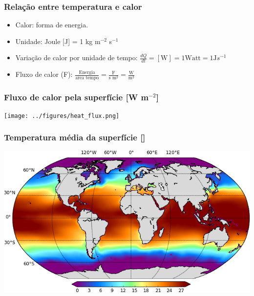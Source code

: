 \begin{frame}
\frametitle{Relação entre temperatura e calor}
    \small{
    \begin{itemize}[<+-| alert@+>]
    \item Calor: forma de energia.
    \item Unidade: Joule [J] = 1 kg m$^{-2}$ s$^{-1}$
    \item Variação de calor por unidade de tempo:
        $\frac{dQ}{dt} = [\text{W}] = 1 \text{Watt} = 1 \text{J} s^{-1}$
    \item Fluxo de calor (F):
        $\frac{\text{Energia}}{\text{area tempo}} = \frac{\text{F}}{\text{s m}^{2}} = \frac{\text{W}}{\text{m}^2}$
    \end{itemize}
    }
\end{frame}

\begin{frame}
\frametitle{Fluxo de calor pela superfície [W m$^{-2}$]}
    \begin{center}
        \texttt{[image: ../figures/heat\_flux.png]}
    \end{center}
\end{frame}

\begin{frame}
\frametitle{Temperatura média da superfície [\textcelsius{}]}
    \begin{center}
        \includegraphics[scale=0.5]{./figures/surface_temperature_woa09.png}
    \end{center}
\end{frame}

